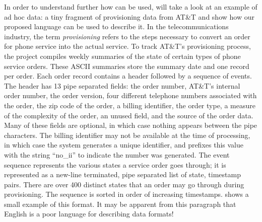 \documentclass[11pt]{article}
\begin{document}


In order to understand further how \datatype{} can be used,
will take a look at an example of ad hoc data:
a tiny fragment of provisioning data from AT\&T and show
how our proposed \datatype{} language can be used to describe it.
In the telecommunications industry, the term \textit{provisioning} refers to 
the steps necessary to convert an order for phone service into the actual 
service.  
To track AT\&T's provisioning process, the \dibbler{} project compiles
weekly summaries of the state of certain types of phone service orders.  
These ASCII summaries store the summary date and one record per order.
Each order record contains a header followed by a sequence of events.
The header has 13 pipe separated fields: the order number, AT\&T's
internal order number, the order version, four different telephone
numbers associated with the order, the zip code of the order, a
billing identifier, the order type, a measure of the complexity of the
order, an unused field, and the source of the order data.  Many of
these fields are optional, in which case nothing appears between the
pipe characters.  The billing identifier may not be available at the
time of processing, in which case the system generates a unique
identifier, and prefixes this value with the string ``no\_ii'' to
indicate the number was generated. The event sequence represents the
various states a service order goes through; it is represented as a
new-line terminated, pipe separated list of state, timestamp pairs.
There are over 400 distinct states that an order may go through during
provisioning.  The sequence is sorted in order of increasing timestamps. 
 shows a small example of
this format.
It may be apparent from this paragraph that English is a poor
language for describing data formats!
\end{document}

